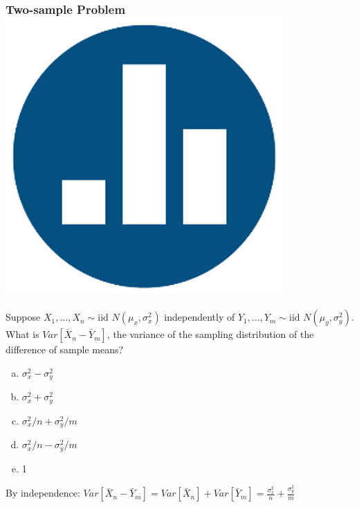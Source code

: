 \begin{frame}
\frametitle{Two-sample Problem \hfill \includegraphics[scale = 0.05]{./images/clicker}}
Suppose $X_1, \hdots, X_{n} \sim \mbox{iid } N(\mu_x, \sigma^2_x)$ independently of $Y_1, \hdots, Y_{m} \sim \mbox{iid } N(\mu_y, \sigma^2_y)$. What is \alert{$Var[\bar{X}_n - \bar{Y}_m]$}, the variance of the sampling distribution of the difference of sample means?

\begin{enumerate}[(a)]
	\item $\sigma_x^2 - \sigma_y^2$
	\item $\sigma_x^2 + \sigma_y^2$
	\item $\sigma_x^2/n + \sigma_y^2/m$
	\item $\sigma_x^2/n - \sigma_y^2/m$
	\item 1
\end{enumerate}

\pause
\vspace{1em} 

\alert{By independence: $Var[\bar{X}_n - \bar{Y}_m] = Var[\bar{X}_n] + Var[\bar{Y}_m] = \displaystyle \frac{\sigma_x^2}{n} + \frac{\sigma_y^2}{m}$}
\end{frame}
